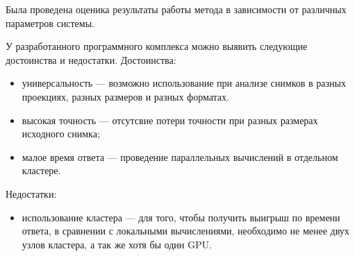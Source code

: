 Была проведена оценика результаты работы метода в зависимости от различных параметров системы.

У разработанного программного комплекса можно выявить следующие достоинства и недостатки.
Достоинства:
\begin{itemize}[label=---]
    \item универсальность --- возможно использование при анализе снимков в разных проекциях, разных размеров и разных форматах.
    \item высокая точность --- отсутсвие потери точности при разных размерах исходного снимка;
    \item малое время ответа --- проведение параллельных вычислений в отдельном кластере.
\end{itemize}

Недостатки:
\begin{itemize}[label=---]
    \item использование кластера --- для того, чтобы получить выигрыш по времени ответа, в сравнении с локальными вычислениями, необходимо не менее двух узлов кластера, а так же хотя бы один GPU.
\end{itemize}